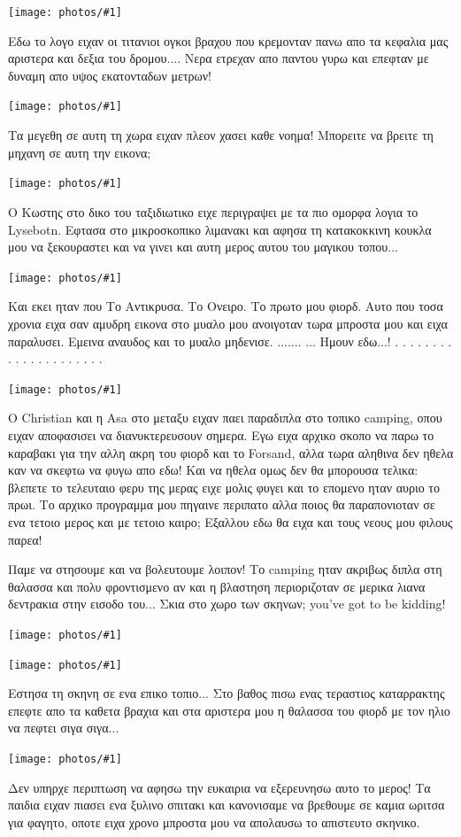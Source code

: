 \documentclass[11pt, letterpaper]{book}
\newcommand\photo[1]{\begin{center}\noindent\texttt{[image: photos/\#1]}\end{center}}
\begin{document}
\photo{197.jpg}

Εδω το λογο ειχαν οι τιτανιοι ογκοι βραχου που κρεμονταν πανω απο τα κεφαλια μας αριστερα και δεξια του δρομου.... 
Νερα ετρεχαν απο παντου γυρω και επεφταν με δυναμη απο υψος εκατονταδων μετρων!

\photo{198.jpg}

Τα μεγεθη σε αυτη τη χωρα ειχαν πλεον χασει καθε νοημα!
Μπορειτε να βρειτε τη μηχανη σε αυτη την εικονα;

\photo{199.jpg}

Ο Κωστης στο δικο του ταξιδιωτικο ειχε περιγραψει με τα πιο ομορφα λογια το Lysebotn. Εφτασα στο μικροσκοπικο λιμανακι και αφησα τη κατακοκκινη κουκλα μου να ξεκουραστει και να γινει και αυτη μερος αυτου του μαγικου τοπου...

\photo{200.jpg}

Και εκει ηταν που Το Αντικρυσα. 
Το Ονειρο. 
Το πρωτο μου φιορδ. 
Αυτο που τοσα χρονια ειχα σαν αμυδρη εικονα στο μυαλο μου ανοιγοταν τωρα μπροστα μου και ειχα παραλυσει.
Εμεινα αναυδος και το μυαλο μηδενισε. 
.......
... Ημουν εδω...!
.
.
.
.
.
.
.
.
.
.
.
.
.
.
.
.
.
.
.
.
.


\photo{201.jpg}

Ο Christian και η Asa στο μεταξυ ειχαν παει παραδιπλα στο τοπικο camping, οπου ειχαν αποφασισει να διανυκτερευσουν σημερα. 
Εγω ειχα αρχικο σκοπο να παρω το καραβακι για την αλλη ακρη του φιορδ και το Forsand, αλλα τωρα αληθινα δεν ηθελα καν να σκεφτω να φυγω απο εδω! 
Και να ηθελα ομως δεν θα μπορουσα τελικα: βλεπετε το τελευταιο φερυ της μερας ειχε μολις φυγει και το επομενο ηταν αυριο το πρωι.
Το αρχικο προγραμμα μου πηγαινε περιπατο αλλα ποιος θα παραπονιοταν σε ενα τετοιο μερος και με τετοιο καιρο; Εξαλλου εδω θα ειχα και τους νεους μου φιλους παρεα! 

Παμε να στησουμε και να βολευτουμε λοιπον!
Το camping ηταν ακριβως διπλα στη θαλασσα και πολυ φροντισμενο αν και η βλαστηση περιοριζοταν σε μερικα λιανα δεντρακια στην εισοδο του... Σκια στο χωρο των σκηνων; you've got to be kidding!

\photo{202.jpg}
\photo{203.jpg}

Εστησα τη σκηνη σε ενα επικο τοπιο... Στο βαθος πισω ενας τεραστιος καταρρακτης επεφτε απο τα καθετα βραχια και στα αριστερα μου η θαλασσα του φιορδ με τον ηλιο να πεφτει σιγα σιγα...

\photo{204.jpg}

Δεν υπηρχε περιπτωση να αφησω την ευκαιρια να εξερευνησω αυτο το μερος! Τα παιδια ειχαν πιασει ενα ξυλινο σπιτακι και κανονισαμε να βρεθουμε σε καμια ωριτσα για φαγητο, οποτε ειχα χρονο μπροστα μου να απολαυσω το απιστευτο σκηνικο. 
\end{document}
